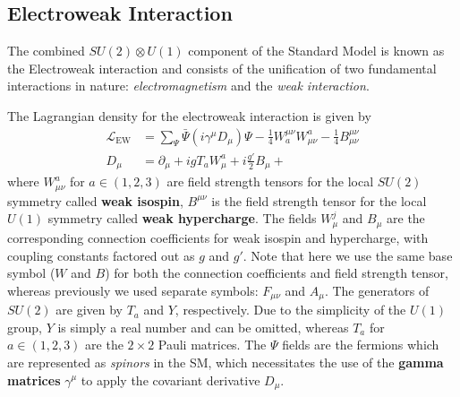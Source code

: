 \subsection{Electroweak Interaction}
The combined $SU(2) \otimes U(1)$ component of the Standard Model is known as the Electroweak interaction and consists of the unification of two fundamental interactions in nature: \textit{electromagnetism} and the \textit{weak interaction}.

The Lagrangian density for the electroweak interaction is given by
\begin{align}
    \mathcal{L}_{\mathrm{EW}} &= \sum_{\Psi}  \bar{\Psi}  (i \gamma^\mu D_\mu) \Psi - \frac{1}{4} W_a^{\mu\nu} W^a_{\mu\nu} - \frac{1}{4} B^{\mu\nu}_{\mu\nu} \\
    D_\mu &= \partial_\mu + i g T_a W_\mu^a + i \frac{g'}{2} B_\mu + 
    \label{eq:ew_deriv}
\end{align}
where $W^a_{\mu\nu}$ for $a \in (1,2,3)$ are field strength tensors for the local $SU(2)$ symmetry called \textbf{weak isospin}, $B^{\mu\nu}$ is the field strength tensor for the local $U(1)$ symmetry called \textbf{weak hypercharge}.
The fields $W_\mu^j$ and $B_\mu$ are the corresponding connection coefficients for weak isospin and hypercharge, with coupling constants factored out as $g$ and $g'$. Note that here we use the same base symbol ($W$ and $B$) for both the connection coefficients and field strength tensor, whereas previously we used separate symbols: $F_{\mu\nu}$ and $A_\mu$.
The generators of $SU(2)$ are given by $T_a$ and $Y$, respectively.
Due to the simplicity of the $U(1)$ group, $Y$ is simply a real number and can be omitted, whereas $T_a$ for $a \in (1,2,3)$ are the $2\times2$ Pauli matrices.
The $\Psi$ fields are the fermions which are represented as \textit{spinors} in the SM, which necessitates the use of the \textbf{gamma matrices} $\gamma^\mu$ to apply the covariant derivative $D_\mu$.

